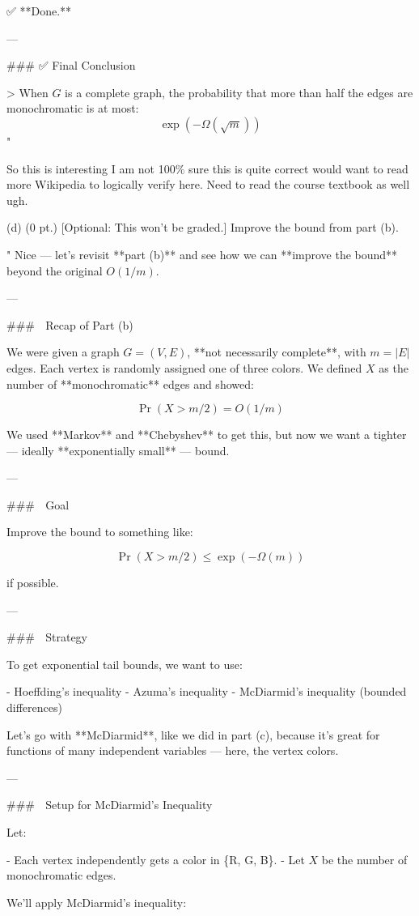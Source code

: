 ✅ **Done.**

---

### ✅ Final Conclusion

> When \( G \) is a complete graph, the probability that more than half the edges are monochromatic is at most:
\[
\boxed{\exp(-\Omega(\sqrt{m}))}
\]
"

So this is interesting I am not 100$\%$ sure this is quite correct would want to read more Wikipedia to logically verify here. Need to read the course textbook as well ugh.

(d) (0 pt.) [Optional: This won't be graded.] Improve the bound from part (b).

"
Nice — let's revisit **part (b)** and see how we can **improve the bound** beyond the original \( O(1/m) \).

---

### 🔁 Recap of Part (b)

We were given a graph \( G = (V, E) \), **not necessarily complete**, with \( m = |E| \) edges. Each vertex is randomly assigned one of three colors. We defined \( X \) as the number of **monochromatic** edges and showed:

\[
\Pr(X > m/2) = O(1/m)
\]

We used **Markov** and **Chebyshev** to get this, but now we want a tighter — ideally **exponentially small** — bound.

---

### 🎯 Goal

Improve the bound to something like:

\[
\Pr(X > m/2) \le \exp(-\Omega(m))
\]

if possible.

---

### 🧠 Strategy

To get exponential tail bounds, we want to use:

- Hoeffding's inequality
- Azuma's inequality
- McDiarmid's inequality (bounded differences)

Let's go with **McDiarmid**, like we did in part (c), because it's great for functions of many independent variables — here, the vertex colors.

---

### 🧩 Setup for McDiarmid's Inequality

Let:

- Each vertex independently gets a color in \{R, G, B\}.
- Let \( X \) be the number of monochromatic edges.

We'll apply McDiarmid's inequality:

